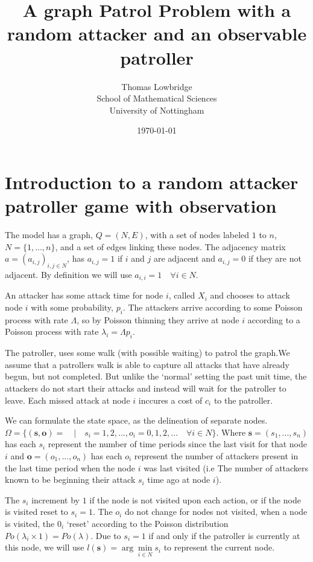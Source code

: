 \documentclass[a4paper,10pt]{article}
\title{A graph Patrol Problem with a random attacker and an observable patroller}
\date{\today}
\author{Thomas Lowbridge \\ School of Mathematical Sciences \\ University of Nottingham}
\theoremstyle{definition}
\theoremstyle{definition}
\theoremstyle{remark}
\theoremstyle{definition}
\begin{document}
\pagestyle{empty}
{
  \renewcommand{\thispagestyle}[1]{}
  \maketitle
  \tableofcontents  
}
\clearpage
\pagestyle{plain}


\setlength{\parindent}{0pt}
\setlength{\parskip}{1em}

\newpage
{}
\section{Introduction to a random attacker patroller game with observation}
The model has a graph, $Q=(N,E)$, with a set of nodes labeled $1$ to $n$, $N=\{1,...,n \}$, and a set of edges linking these nodes. The adjacency matrix $a=(a_{i,j})_{i,j \in N}$, has $a_{i,j}=1$ if $i$ and $j$ are adjacent and $a_{i,j}=0$ if they are not adjacent. By definition we will use $a_{i,i}=1 \quad \forall i \in N$.


An attacker has some attack time for node $i$, called $X_{i}$ and chooses to attack node $i$ with some probability, $p_{i}$. The attackers arrive according to some Poisson process with rate $\Lambda$, so by Poisson thinning they arrive at node $i$ according to a Poisson process with rate $\lambda_{i}=\Lambda p_{i}$.

The patroller, uses some walk (with possible waiting) to patrol the graph.We assume that a patrollers walk is able to capture all attacks that have already begun, but not completed. But unlike the `normal' setting the past unit time, the attackers do not start their attacks and instead will wait for the patroller to leave. Each missed attack at node $i$ inccures a cost of $c_{i}$ to the patroller.

We can formulate the state space, as the delineation of separate nodes. $\Omega= \{ (\bm{s},\bm{o})= \quad | \quad s_{i}=1,2,... , o_{i}=0,1,2,... \quad \forall i \in N \}$. Where $\bm{s}=(s_{1},...,s_{n})$ has each $s_{i}$ represent the number of time periods since the last visit for that node $i$ and $\bm{o}=(o_{1},...,o_{n})$ has each $o_{i}$ represent the number of attackers present in the last time period when the node $i$ was last visited (i.e The number of attackers known to be beginning their attack $s_{i}$ time ago at node $i$).

The $s_{i}$ increment by $1$ if the node is not visited upon each action, or if the node is visited reset to $s_{i}=1$. The $o_{i}$ do not change for nodes not visited, when a node is visited, the $0_{i}$ `reset' according to the Poisson distribution $Po(\lambda_{i} \times 1)=Po(\lambda)$. Due to $s_{i}=1$ if and only if the patroller is currently at this node, we will use $l(\bm{s})=\arg\min\limits_{i \in N} s_{i}$ to represent the current node.
\end{document}
